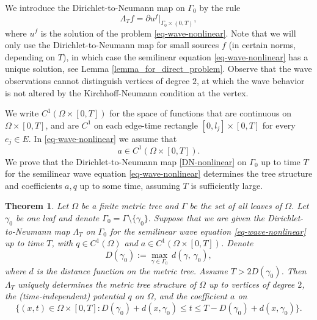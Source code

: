 \documentclass[11pt]{amsart}
\theoremstyle{definition}
\theoremstyle{plain}
\newtheorem{theorem}{Theorem}
\numberwithin{equation}{section}
\newcommand\gm{\gamma}
\begin{document}
We introduce the Dirichlet-to-Neumann map on $\Gamma_0$ by the rule
\begin{equation}\label{DN-nonlinear}
\Lambda_T f = \partial u^f|_{\Gamma_0 \times (0,T)},
\end{equation}
where $u^f$ is the solution of the problem \eqref{eq-wave-nonlinear}.
Note that we will only use the Dirichlet-to-Neumann map for small sources $f$ (in certain norms, depending on $T$), in which case the semilinear equation \eqref{eq-wave-nonlinear} has a unique solution, see Lemma \ref{lemma_for_direct_problem}.
Observe that the wave observations cannot distinguish vertices of degree $2$, at which the wave behavior is not altered by the Kirchhoff-Neumann condition at the vertex.

We write $C^1(\Omega\times[0,T])$ for the space of functions that are continuous on $\Omega\times[0,T]$, and are $C^1$ on each edge-time rectangle $[0,l_j]\times[0,T]$ for every $e_j\in E$.
In \eqref{eq-wave-nonlinear}  we assume that
\begin{equation} \label{a-q-C2}
a\in C^1(\Omega\times[0,T]).
\end{equation}
We prove that the Dirichlet-to-Neumann map \eqref{DN-nonlinear} on $\Gamma_0$ up to time $T$ for the semilinear wave equation \eqref{eq-wave-nonlinear} determines the tree structure and coefficients $a,q$ up to some time, assuming $T$ is sufficiently large.


\begin{theorem} \label{main-tree}
Let $\Omega$ be a finite metric tree and $\Gamma$ be the set of all leaves of $\Omega$. 
Let $\gamma_0$ be one leaf and denote $\Gamma_0=\Gamma\setminus \{\gamma_0\}.$ 
Suppose that we are given the Dirichlet-to-Neumann map $\Lambda_T$ on $\Gamma_0$ for the semilinear wave equation \eqref{eq-wave-nonlinear} up to time $T$, with $q\in C^1(\Omega)$ and $a\in C^1(\Omega \times [0,T])$.
Denote 
\begin{equation}\label{diameter-gamma0}
D(\gamma_0):=\max_{\gamma\in \Gamma_0} \, d (\gm,\, \gm_0 ),
\end{equation}
where $d$ is the distance function on the metric tree.
Assume $T>2D(\gamma_0)$. Then $\Lambda_T$ uniquely determines the metric tree structure of $\Omega$ up to vertices of degree $2$, the (time-independent) potential $q$ on $\Omega$, and the coefficient $a$ on
\begin{equation} \label{Domain_recovery}
\Big\{(x,t)\in \Omega\times [0,T]: D(\gamma_0)+d(x,\gamma_0) \leq t \leq T-D(\gamma_0)+d(x,\gamma_0) \Big\}.
\end{equation}
\end{theorem}
\end{document}
